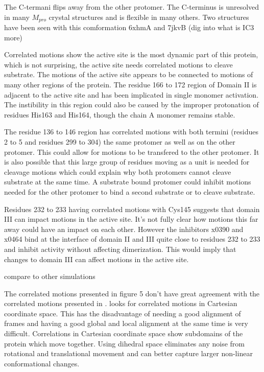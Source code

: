 \documentclass{biophys-new}
\begin{document}
The C-termani flips away from the other protomer. The C-terminus is unresolved in many $M_{pro}$ crystal structures and is flexible in many others.\cite{jaskolski2021crystallographic} Two structures have been seen with this comformation 6xhmA and 7jkvB
(dig into what is IC3 more)

Correlated motions show the active site is the most dynamic part of this protein, which is not surprising, the active site needs correlated motions to cleave substrate. The motions of the active site appears to be connected to motions of many other regions of the protein. The residue 166 to 172 region of Domain II is adjacent to the active site and has been implicated in single monomer activation. The instibility in this region could also be caused by the improper protonation of residues His163 and His164, though the chain A monomer remains stable.

The residue 136 to 146 region has correlated motions with both termini (residues 2 to 5 and residues 299 to 304) the same protomer as well as on the other protomer. This could allow for motions to be transfered to the other protomer. It is also possible that this large group of residues moving as a unit is needed for cleavage motions which could explain why both protomers cannot cleave substrate at the same time. A substrate bound protomer could inhibit motions needed for the other protomer to bind a second substrate or to cleave substrate.

Residues 232 to 233 having correlated motions with Cys145 suggests that domain III can impact motions in the active site. It's not fully clear how motions this far away could have an impact on each other. However the inhibitors x0390 and x0464 bind at the interface of domain II and III quite close to residues 232 to 233 and inhibit activity without affecting dimerization. \cite{el2020allosteric} This would imply that changes to domain III can affect motions in the active site.

compare to other simulations

The correlated motions presented in figure 5 don't have great agreement with the correlated motions presented in \cite{sztain2020elucidation}. \cite{sztain2020elucidation} looks for correlated motions in Cartesian coordinate space. This has the disadvantage of needing a good alignment of frames and having a good global and local alignment at the same time is very difficult. Correlations in Cartesian coordinate space show subdomains of the protein which move together. Using dihedral space eliminates any noise from rotational and translational movement and can better capture larger non-linear conformational changes.
\end{document}
